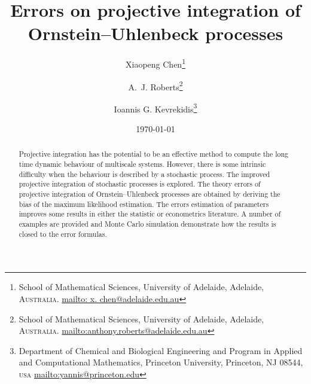 \documentclass[12pt,reqno, a4paper]{article}
\numberwithin{equation}{section}
\begin{document}
\title{ Errors on projective integration of  Ornstein--Uhlenbeck processes}


\author{
Xiaopeng Chen\thanks{School of Mathematical Sciences, University of
Adelaide, Adelaide, \textsc{Australia}. \protect\url{mailto:
x. chen@adelaide.edu.au} } \and A.~J.
Roberts\thanks{School of Mathematical Sciences, University of
Adelaide, Adelaide, \textsc{Australia}.
\protect\url{mailto:anthony.roberts@adelaide.edu.au}} \and Ioannis G. Kevrekidis\thanks{Department of Chemical and Biological Engineering and Program in Applied and
Computational Mathematics, Princeton University, Princeton, NJ 08544, \textsc{usa}
\protect\url{mailto:yannis@princeton.edu}}
 }
\date{\today}


\maketitle


\begin{abstract}
Projective integration has the potential to be an  effective method to
compute the long time dynamic behaviour of multiscale systems.   However,   there is some intrinsic difficulty when the behaviour is described by a stochastic process. The improved  projective integration of stochastic processes is explored. The theory errors of projective integration of Ornstein--Uhlenbeck processes are obtained by deriving the bias of the maximum likelihood estimation. The errors estimation of parameters improves some results in either the statistic or econometrics literature.  A number of examples are provided and  Monte Carlo simulation demonstrate how the results is closed to the  error formulas.  
\end{abstract}
\end{document}
